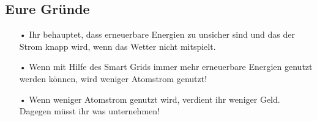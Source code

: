 \documentclass[11pt,a4paper,DIV=10,parskip=half,BCOR=0mm]{scrartcl}
\begin{document}
\subsection*{Eure Gründe}
\begin{enumerate}
	\item[•]Ihr behauptet, dass erneuerbare Energien zu unsicher sind und das der Strom knapp wird, wenn das Wetter nicht mitspielt.
	\item[•]Wenn mit Hilfe des Smart Grids immer mehr erneuerbare Energien
genutzt werden können, wird weniger Atomstrom genutzt!
	\item[•] Wenn weniger Atomstrom genutzt wird, verdient ihr weniger Geld.
Dagegen müsst ihr was unternehmen!
\end{enumerate}
\end{document}
